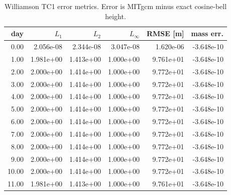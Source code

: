\begin{table}[htbp]
\centering
{}
\begin{tabular}{rrrrrr}
\toprule
\rowcolor{gray!25}
day & $L_1$ & $L_2$ & $L_\infty$ & RMSE [m] & mass err. \\ 
\midrule
0.00 & 2.056e-08 & 2.344e-08 & 3.047e-08 & 1.620e-06 & -3.648e-10 \\ 
1.00 & 1.981e+00 & 1.413e+00 & 1.000e+00 & 9.761e+01 & -3.648e-10 \\ 
2.00 & 2.000e+00 & 1.414e+00 & 1.000e+00 & 9.772e+01 & -3.648e-10 \\ 
3.00 & 2.000e+00 & 1.414e+00 & 1.000e+00 & 9.772e+01 & -3.648e-10 \\ 
4.00 & 2.000e+00 & 1.414e+00 & 1.000e+00 & 9.772e+01 & -3.648e-10 \\ 
5.00 & 2.000e+00 & 1.414e+00 & 1.000e+00 & 9.772e+01 & -3.648e-10 \\ 
6.00 & 2.000e+00 & 1.414e+00 & 1.000e+00 & 9.772e+01 & -3.648e-10 \\ 
7.00 & 2.000e+00 & 1.414e+00 & 1.000e+00 & 9.772e+01 & -3.648e-10 \\ 
8.00 & 2.000e+00 & 1.414e+00 & 1.000e+00 & 9.772e+01 & -3.648e-10 \\ 
9.00 & 2.000e+00 & 1.414e+00 & 1.000e+00 & 9.772e+01 & -3.648e-10 \\ 
10.00 & 2.000e+00 & 1.414e+00 & 1.000e+00 & 9.772e+01 & -3.648e-10 \\ 
11.00 & 1.981e+00 & 1.413e+00 & 1.000e+00 & 9.761e+01 & -3.648e-10 \\ 
\bottomrule
\end{tabular}
\caption{Williamson TC1 error metrics. Error is MITgcm minus exact cosine-bell height.}
\end{table}

